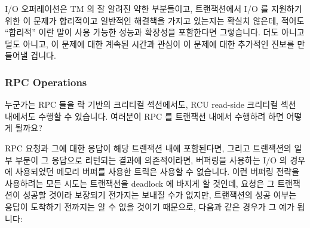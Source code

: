 I/O 오퍼레이션은 TM 의 잘 알려진 약한 부분들이고, 트랜잭션에서 I/O 를 지원하기
위한 이 문제가 합리적이고 일반적인 해결책을 가지고 있는지는 확실치 않은데,
적어도 ``합리적'' 이란 말이 사용 가능한 성능과 확장성을 포함한다면 그렇습니다.
더도 아니고 덜도 아니고, 이 문제에 대한 계속된 시간과 관심이 이 문제에 대한
추가적인 진보를 만들어낼 겁니다.

\subsubsection{RPC Operations}
\label{sec:future:RPC Operations}

누군가는 RPC 들을 락 기반의 크리티컬 섹션에서도, RCU read-side 크리티컬 섹션
내에서도 수행할 수 있습니다.
여러분이 RPC 를 트랜잭션 내에서 수행하려 하면 어떻게 될까요?

RPC 요청과 그에 대한 응답이 해당 트랜잭션 내에 포함된다면, 그리고 트랜잭션의
일부 부분이 그 응답으로 리턴되는 결과에 의존적이라면, 버퍼링을 사용하는 I/O 의
경우에 사용되었던 메모리 버퍼를 사용한 트릭은 사용할 수 없습니다.
이런 버퍼링 전략을 사용하려는 모든 시도는 트랜잭션을 deadlock 에 바지게 할
것인데, 요청은 그 트랜잭션이 성공할 것이라 보장되기 전가지는 보내질 수가
없지만, 트랜잭션의 성공 여부는 응답이 도착하기 전까지는 알 수 없을 것이기
때문으로, 다음과 같은 경우가 그 예가 됩니다:

